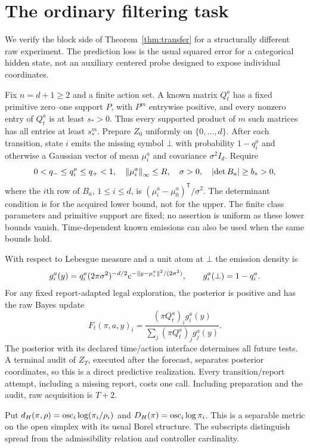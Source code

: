 \section{The ordinary filtering task}\label{sec:filters}
We verify the block side of Theorem~\ref{thm:transfer} for a structurally different raw experiment. The prediction loss is the usual squared error for a categorical hidden state, not an auxiliary centered probe designed to expose individual coordinates.

Fix $n=d+1\ge2$ and a finite action set. A known matrix $Q_t^a$ has a fixed primitive zero--one support $P$, with $P^m$ entrywise positive, and every nonzero entry of $Q_t^a$ is at least $s_*>0$. Thus every supported product of $m$ such matrices has all entries at least $s_*^m$. Prepare $Z_0$ uniformly on $\{0,\ldots,d\}$. After each transition, state $i$ emits the missing symbol $\bot$ with probability $1-q_i^a$ and otherwise a Gaussian vector of mean $\mu_i^a$ and covariance $\sigma^2I_d$. Require
\begin{equation}\label{eq:gaussparams}
 0<q_-\le q_i^a\le q_+<1,\quad \left\lVert\mu_i^a\right\rVert_\infty\le R,
 \quad \sigma>0,
 \quad \left\lvert\det B_a\right\rvert\ge b_*>0,
\end{equation}
where the $i$th row of $B_a$, $1\le i\le d$, is $(\mu_i^a-\mu_0^a)^{\mathsf T}/\sigma^2$. The determinant condition is for the acquired lower bound, not for the upper. The finite class parameters and primitive support are fixed; no assertion is uniform as these lower bounds vanish. Time-dependent known emissions can also be used when the same bounds hold.

With respect to Lebesgue measure and a unit atom at $\bot$ the emission density is
\[
 g_i^a(y)=q_i^a(2\pi\sigma^2)^{-d/2}
       e^{-\left\lVert y-\mu_i^a\right\rVert^2/(2\sigma^2)},\qquad
 g_i^a(\bot)=1-q_i^a.
\]
For any fixed report-adapted legal exploration, the posterior is positive and has the raw Bayes update
\begin{equation}\label{eq:filterupdate}
 F_t(\pi,a,y)_i=
 \frac{(\pi Q_t^a)_i g_i^a(y)}{\sum_j(\pi Q_t^a)_j g_j^a(y)}.
\end{equation}
The posterior with its declared time/action interface determines all future tests. A terminal audit of $Z_T$, executed after the forecast, separates posterior coordinates, so this is a direct predictive realization. Every transition/report attempt, including a missing report, costs one call. Including preparation and the audit, raw acquisition is $T+2$.

Put $d_H(\pi,\rho)=\operatorname{osc}_i\log(\pi_i/\rho_i)$ and $D_H(\pi)=\operatorname{osc}_i\log\pi_i$. This is a separable metric on the open simplex with its usual Borel structure. The subscripts distinguish spread from the admissibility relation and controller cardinality.

